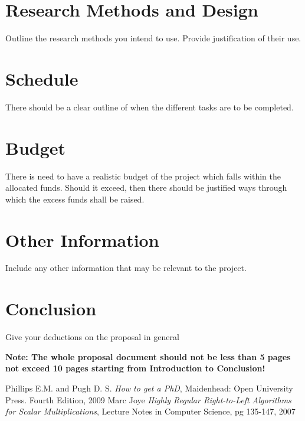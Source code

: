 \documentclass[12pt,svgnames,smaller]{article} %
\begin{document}
\section{\textbf{Research Methods and Design}} Outline the research methods you intend to use.  Provide justification of their use.
\section{\textbf{Schedule}} There should be a clear outline of when the different tasks are to be completed.
\section{\textbf{Budget}} There is need to have a realistic budget of the project which falls within the allocated funds. Should it exceed, then there should be justified ways through which the excess funds shall be raised.
\section{\textbf{Other Information}} Include any other information that may be relevant to the project.
\section{Conclusion} Give your deductions on the proposal in general

\textbf{Note: The whole proposal document should not be less than 5 pages not exceed 10 pages starting from Introduction to Conclusion!}\cite{Phillips09}

\clearpage
\newpage
\begin{thebibliography}{10}
Phillips E.M. and Pugh D. S.
\emph{How to get a PhD}, Maidenhead: Open University Press. Fourth Edition, 2009
Marc Joye
\emph{Highly Regular Right-to-Left Algorithms for Scalar Multiplications}, Lecture Notes in Computer Science, pg 135-147, 2007
\end{thebibliography}
\end{document}
